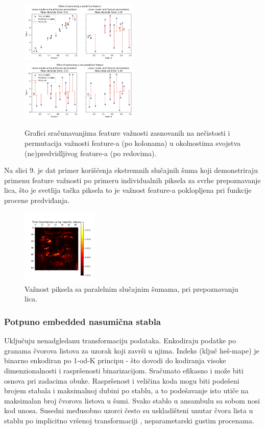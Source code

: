 \documentclass[fontsize=12bp, paper=a4]{scrarticle}
\begin{document}
    \begin{figure}[h!]
        \centering
        \includegraphics[width=0.5\textwidth]{image-9.png}
        \includegraphics[width=0.5\textwidth]{image-7.png}
        \caption{Grafici sračunavanjima feature važnosti zasnovanih na nečistosti i permutacija važnosti feature-a (po kolonama) u okolnostima svojstva (ne)predvidljivog feature-a (po redovima).}
    \end{figure}
    
    Na slici 9. je dat primer korišćenja ekstremnih slučajnih šuma koji demonstriraju primenu feature važnosti po primeru individualnih piksela za svrhe prepoznavanje lica, što je svetlija tačka piksela to je važnost feature-a poklopljena pri funkcije procene predviđanja.
    \begin{figure}[h!]
        \centering
        \includegraphics[width=0.32\textwidth]{image-8.png}
        \caption{Važnost piksela sa paralelnim slučajnim šumama, pri prepoznavanju lica.}
    \end{figure}

    \subsubsection{Potpuno embedded nasumična stabla}
    Uključuju nenadgledanu transformaciju podataka. Enkodiraju podatke po granama čvorova listova za uzorak koji završi u njima. Indeks (ključ heš-mape) je binarno enkodiran po 1-od-K principu\cite{1ok} - što dovodi do kodiranja visoke dimenzionalnosti i raspršenosti binarizacijom. Sračunato efikasno i može biti osnova pri zadacima obuke. Raspršenost i veličina koda mogu biti podešeni brojem stabala i maksimalnoj dubini po stablu, a to podešavanje isto utiče na maksimalan broj čvorova listova u šumi. Svako stablo u ansambulu sa sobom nosi kod unosa.
    Susedni međusobno uzorci često su uskladišteni unutar čvora lista u stablu po implicitno vršenoj transformaciji , neparametarski gustim procenama.
\newpage
\end{document}
